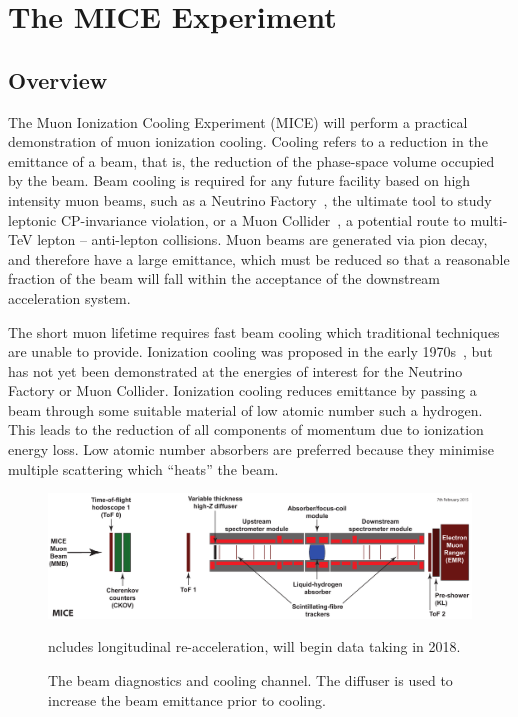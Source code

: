 \section{The MICE Experiment}
\label{sec:MICE}
  \subsection{Overview}
  \label{subsec:Overview}
  The Muon Ionization Cooling Experiment (MICE) will perform a practical demonstration of muon ionization cooling. Cooling refers to a reduction in the emittance of a beam, that is, the reduction of the phase-space volume occupied by the beam. Beam cooling is required for any future facility based on high intensity muon beams, such as a Neutrino Factory~\cite{ISS-Physics}, the ultimate tool to study leptonic CP-invariance violation, or a Muon Collider~\cite{MC_Overview}, a potential route to multi-TeV lepton -- anti-lepton collisions. Muon beams are generated via pion decay, and therefore have a large emittance, which must be reduced so that a reasonable fraction of the beam will fall within the acceptance of the downstream acceleration system.

  The short muon lifetime requires fast beam cooling which traditional techniques are unable to provide.  Ionization cooling was proposed in the early 1970s~\cite{Skrinsky, Neuffer}, but has not yet been demonstrated at the energies of interest for the Neutrino Factory or Muon Collider.  Ionization cooling reduces emittance by passing a beam through some suitable material of low atomic number such a hydrogen.  This leads to the reduction of all components of momentum due to ionization energy loss. Low atomic number absorbers are preferred because they minimise multiple scattering which ``heats'' the beam. %

  \begin{figure}[bht]
    \begin{center}
      \includegraphics[width=1.0\linewidth]{01-MICE/Step-4-labels.pdf}
      \caption{\label{fig:CoolingChannel} The beam diagnostics and cooling channel. The diffuser is used to increase the beam emittance prior to cooling.}
    \end{center}ncludes longitudinal re-acceleration, will begin data taking in 2018.
  \end{figure}

